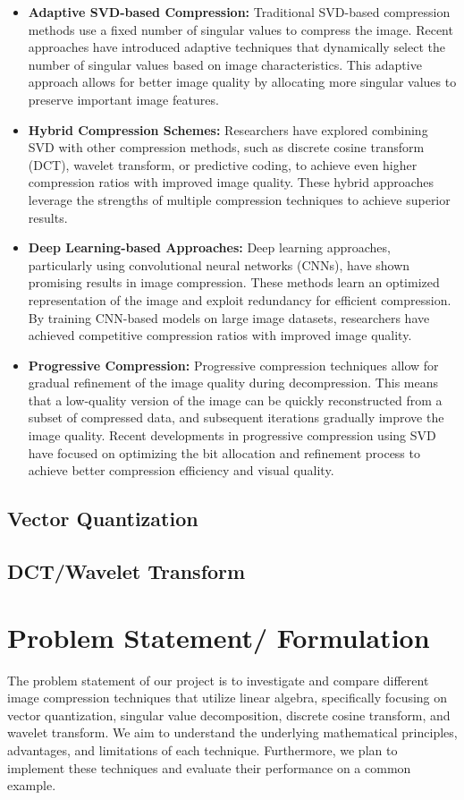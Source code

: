 \documentclass{article}
\begin{document}
\begin{itemize}
  \item {\textbf{Adaptive SVD-based Compression:} Traditional SVD-based compression methods use a fixed number of singular values to compress the image. Recent approaches have introduced adaptive techniques that dynamically select the number of singular values based on image characteristics. This adaptive approach allows for better image quality by allocating more singular values to preserve important image features.}
  \item {\textbf{Hybrid Compression Schemes:} Researchers have explored combining SVD with other compression methods, such as discrete cosine transform (DCT), wavelet transform, or predictive coding, to achieve even higher compression ratios with improved image quality. These hybrid approaches leverage the strengths of multiple compression techniques to achieve superior results.}
  \item {\textbf{Deep Learning-based Approaches:} Deep learning approaches, particularly using convolutional neural networks (CNNs), have shown promising results in image compression. These methods learn an optimized representation of the image and exploit redundancy for efficient compression. By training CNN-based models on large image datasets, researchers have achieved competitive compression ratios with improved image quality.}
  \item {\textbf{Progressive Compression:} Progressive compression techniques allow for gradual refinement of the image quality during decompression. This means that a low-quality version of the image can be quickly reconstructed from a subset of compressed data, and subsequent iterations gradually improve the image quality. Recent developments in progressive compression using SVD have focused on optimizing the bit allocation and refinement process to achieve better compression efficiency and visual quality.}
\end{itemize}

\subsection{Vector Quantization}

\subsection{DCT/Wavelet Transform}

\section{Problem Statement/ Formulation}
The problem statement of our project is to investigate and compare different image compression techniques that utilize linear algebra, specifically focusing on vector quantization, singular value decomposition, discrete cosine transform, and wavelet transform. We aim to understand the underlying mathematical principles, advantages, and limitations of each technique. Furthermore, we plan to implement these techniques and evaluate their performance on a common example.
\end{document}
